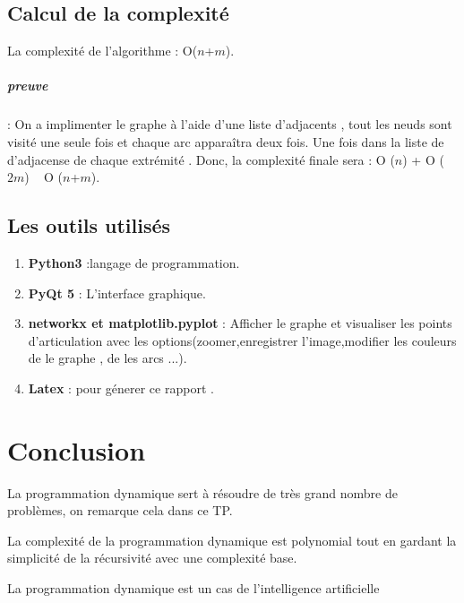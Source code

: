 \documentclass[12pt]{report}
\begin{document}
	
	\section{Calcul de la complexité}
	\par{} 
	La complexité de l'algorithme : O($n$+$m$).	
	\paragraph*{preuve}:
	On a implimenter le graphe à l'aide d'une liste d'adjacents , tout les neuds sont visité une seule fois et chaque arc apparaîtra deux fois. Une fois dans la liste de d'adjacense de chaque extrémité  . Donc, la complexité finale sera : O ($n$) + O ($2m$) ~ O ($n$+$m$).
	\section{Les outils utilisés}
	\begin{enumerate}
		\item \textbf{Python3} :langage de programmation. 
		\item \textbf{PyQt 5} : L'interface graphique.
		\item \textbf{networkx et matplotlib.pyplot} : Afficher le graphe et visualiser les points d'articulation avec les options(zoomer,enregistrer l'image,modifier les couleurs de le graphe , de les arcs ...).
		\item \textbf{Latex} : pour génerer ce rapport .
		
\end{enumerate}	
	\chapter{Conclusion}
	\par{} 
	La programmation dynamique sert à résoudre de très grand nombre de problèmes, on remarque cela dans ce TP.
	\par{}	
	La complexité de la programmation dynamique est polynomial tout en gardant la simplicité de la récursivité avec une complexité base.
	\par{}
	La programmation dynamique est un cas de l'intelligence artificielle 
	
\end{document}
